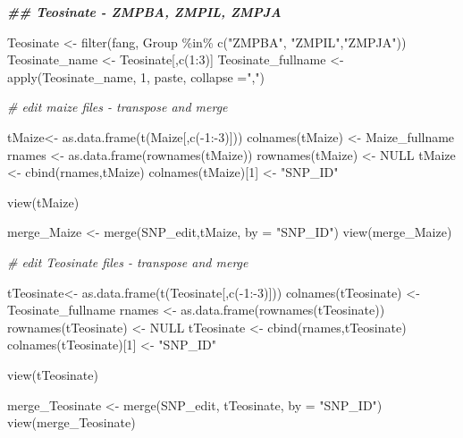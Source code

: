 \documentclass[
]{article}
\newenvironment{Shaded}{\begin{snugshade}}{\end{snugshade}}
\newcommand{\AttributeTok}[1]{\textcolor[rgb]{0.77,0.63,0.00}{#1}}
\newcommand{\CommentTok}[1]{\textcolor[rgb]{0.56,0.35,0.01}{\textit{#1}}}
\newcommand{\ConstantTok}[1]{\textcolor[rgb]{0.00,0.00,0.00}{#1}}
\newcommand{\DecValTok}[1]{\textcolor[rgb]{0.00,0.00,0.81}{#1}}
\newcommand{\DocumentationTok}[1]{\textcolor[rgb]{0.56,0.35,0.01}{\textbf{\textit{#1}}}}
\newcommand{\FunctionTok}[1]{\textcolor[rgb]{0.00,0.00,0.00}{#1}}
\newcommand{\NormalTok}[1]{#1}
\newcommand{\OtherTok}[1]{\textcolor[rgb]{0.56,0.35,0.01}{#1}}
\newcommand{\SpecialCharTok}[1]{\textcolor[rgb]{0.00,0.00,0.00}{#1}}
\newcommand{\StringTok}[1]{\textcolor[rgb]{0.31,0.60,0.02}{#1}}
\begin{document}
\begin{Shaded}
\begin{Highlighting}[]
\DocumentationTok{\#\# Teosinate {-} ZMPBA, ZMPIL, ZMPJA}

\NormalTok{Teosinate }\OtherTok{\textless{}{-}} \FunctionTok{filter}\NormalTok{(fang, Group }\SpecialCharTok{\%in\%} \FunctionTok{c}\NormalTok{(}\StringTok{"ZMPBA"}\NormalTok{, }\StringTok{"ZMPIL"}\NormalTok{,}\StringTok{"ZMPJA"}\NormalTok{))}
\NormalTok{Teosinate\_name }\OtherTok{\textless{}{-}}\NormalTok{ Teosinate[,}\FunctionTok{c}\NormalTok{(}\DecValTok{1}\SpecialCharTok{:}\DecValTok{3}\NormalTok{)]}
\NormalTok{Teosinate\_fullname }\OtherTok{\textless{}{-}} \FunctionTok{apply}\NormalTok{(Teosinate\_name, }\DecValTok{1}\NormalTok{, paste, }\AttributeTok{collapse =}\StringTok{","}\NormalTok{)}

\CommentTok{\# edit maize files {-} transpose and merge}

\NormalTok{tMaize}\OtherTok{\textless{}{-}} \FunctionTok{as.data.frame}\NormalTok{(}\FunctionTok{t}\NormalTok{(Maize[,}\FunctionTok{c}\NormalTok{(}\SpecialCharTok{{-}}\DecValTok{1}\SpecialCharTok{:{-}}\DecValTok{3}\NormalTok{)]))}
\FunctionTok{colnames}\NormalTok{(tMaize) }\OtherTok{\textless{}{-}}\NormalTok{ Maize\_fullname}
\NormalTok{rnames }\OtherTok{\textless{}{-}} \FunctionTok{as.data.frame}\NormalTok{(}\FunctionTok{rownames}\NormalTok{(tMaize))}
\FunctionTok{rownames}\NormalTok{(tMaize) }\OtherTok{\textless{}{-}} \ConstantTok{NULL}
\NormalTok{tMaize }\OtherTok{\textless{}{-}} \FunctionTok{cbind}\NormalTok{(rnames,tMaize)}
\FunctionTok{colnames}\NormalTok{(tMaize)[}\DecValTok{1}\NormalTok{] }\OtherTok{\textless{}{-}} \StringTok{"SNP\_ID"}

\FunctionTok{view}\NormalTok{(tMaize)}

\NormalTok{merge\_Maize }\OtherTok{\textless{}{-}} \FunctionTok{merge}\NormalTok{(SNP\_edit,tMaize, }\AttributeTok{by =} \StringTok{"SNP\_ID"}\NormalTok{)}
\FunctionTok{view}\NormalTok{(merge\_Maize)}

\CommentTok{\# edit Teosinate files {-} transpose and merge}

\NormalTok{tTeosinate}\OtherTok{\textless{}{-}} \FunctionTok{as.data.frame}\NormalTok{(}\FunctionTok{t}\NormalTok{(Teosinate[,}\FunctionTok{c}\NormalTok{(}\SpecialCharTok{{-}}\DecValTok{1}\SpecialCharTok{:{-}}\DecValTok{3}\NormalTok{)]))}
\FunctionTok{colnames}\NormalTok{(tTeosinate) }\OtherTok{\textless{}{-}}\NormalTok{ Teosinate\_fullname}
\NormalTok{rnames }\OtherTok{\textless{}{-}} \FunctionTok{as.data.frame}\NormalTok{(}\FunctionTok{rownames}\NormalTok{(tTeosinate))}
\FunctionTok{rownames}\NormalTok{(tTeosinate) }\OtherTok{\textless{}{-}} \ConstantTok{NULL}
\NormalTok{tTeosinate }\OtherTok{\textless{}{-}} \FunctionTok{cbind}\NormalTok{(rnames,tTeosinate)}
\FunctionTok{colnames}\NormalTok{(tTeosinate)[}\DecValTok{1}\NormalTok{] }\OtherTok{\textless{}{-}} \StringTok{"SNP\_ID"}

\FunctionTok{view}\NormalTok{(tTeosinate)}

\NormalTok{merge\_Teosinate }\OtherTok{\textless{}{-}} \FunctionTok{merge}\NormalTok{(SNP\_edit, tTeosinate, }\AttributeTok{by =} \StringTok{"SNP\_ID"}\NormalTok{)}
\FunctionTok{view}\NormalTok{(merge\_Teosinate)}
\end{Highlighting}
\end{Shaded}
\end{document}
